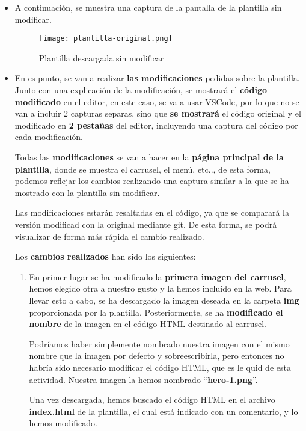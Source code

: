 \begin{itemize}
    \item A continuación, se muestra una captura de la pantalla de la plantilla sin modificar.

    \begin{figure}[H]
        \centering
        \texttt{[image: plantilla-original.png]}
        \caption{Plantilla descargada sin modificar}
    \end{figure}

    \item En es punto, se van a realizar \textbf{las modificaciones} pedidas sobre la plantilla. Junto con una explicación de la modificación, se mostrará el \textbf{código modificado} en el editor, en este caso, se va a usar VSCode, por lo que no se van a incluir 2 capturas separas, sino que \textbf{se mostrará} el código original y el modificado en \textbf{2 pestañas} del editor, incluyendo una captura del código por cada modificación.

    Todas las \textbf{modificaciones} se van a hacer en la \textbf{página principal de la plantilla}, donde se muestra el carrusel, el menú, etc.., de esta forma, podemos reflejar los cambios realizando una captura similar a la que se ha mostrado con la plantilla sin modificar.

    Las modificaciones estarán resaltadas en el código, ya que se comparará la versión modificad con la original mediante git. De esta forma, se podrá visualizar de forma más rápida el cambio realizado.

    Los \textbf{cambios realizados} han sido los siguientes:

    \begin{enumerate}
        \item En primer lugar se ha modificado la \textbf{primera imagen del carrusel}, hemos elegido otra a nuestro gusto y la hemos incluido en la web. Para llevar esto a cabo, se ha descargado la imagen deseada en la carpeta \textbf{img} proporcionada por la plantilla. Posteriormente, se ha \textbf{modificado el nombre} de la imagen en el código HTML destinado al carrusel.

        Podríamos haber simplemente nombrado nuestra imagen con el mismo nombre que la imagen por defecto y sobreescribirla, pero entonces no habría sido necesario modificar el código HTML, que es le quid de esta actividad. Nuestra imagen la hemos nombrado ``\textbf{hero-1.png}''.

        Una vez descargada, hemos buscado el código HTML en el archivo \textbf{index.html} de la plantilla, el cual está indicado con un comentario, y lo hemos modificado.


\end{enumerate}
\end{itemize}
